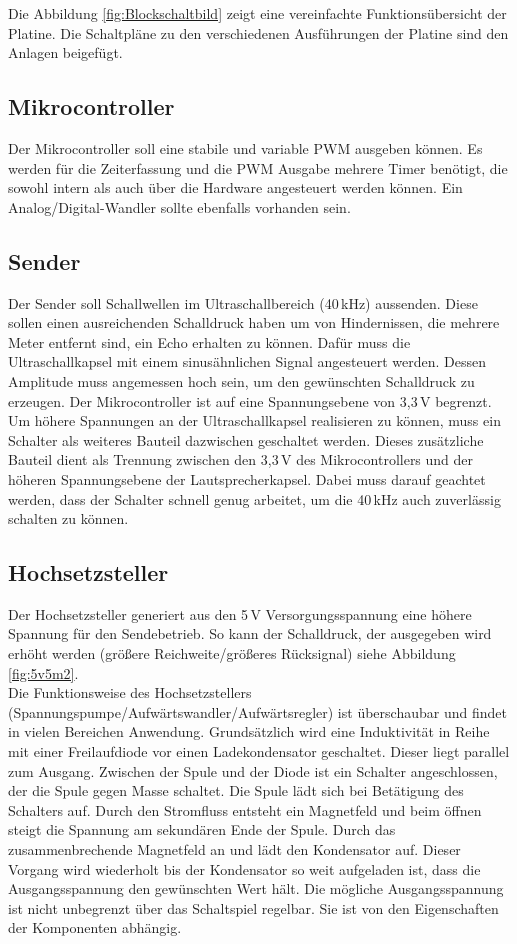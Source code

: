 Die Abbildung \ref{fig:Blockschaltbild} zeigt eine vereinfachte Funktionsübersicht der Platine. Die Schaltpläne zu den verschiedenen Ausführungen der Platine sind den Anlagen beigefügt.

\subsection{Mikrocontroller}
Der Mikrocontroller soll eine stabile und variable PWM ausgeben können. Es werden für die Zeiterfassung und die PWM Ausgabe mehrere Timer benötigt, die sowohl intern als auch über die Hardware angesteuert werden können. Ein Analog/Digital-Wandler sollte ebenfalls vorhanden sein.

\subsection{Sender}
Der Sender soll Schallwellen im Ultraschallbereich (40\,kHz) aussenden. Diese sollen einen ausreichenden Schalldruck haben um von Hindernissen, die mehrere Meter entfernt sind, ein Echo erhalten zu können. Dafür muss die Ultraschallkapsel mit einem sinusähnlichen Signal angesteuert werden. Dessen Amplitude muss angemessen hoch sein, um den gewünschten Schalldruck zu erzeugen. Der Mikrocontroller ist auf eine Spannungsebene von 3,3\,V begrenzt. Um höhere Spannungen an der Ultraschallkapsel realisieren zu können, muss ein Schalter als weiteres Bauteil dazwischen geschaltet werden. Dieses zusätzliche Bauteil dient als Trennung zwischen den 3,3\,V des Mikrocontrollers und der höheren Spannungsebene der Lautsprecherkapsel. Dabei muss darauf geachtet werden, dass der Schalter schnell genug arbeitet, um die 40\,kHz auch zuverlässig schalten zu können.

\subsection{Hochsetzsteller}
Der Hochsetzsteller generiert aus den 5\,V Versorgungsspannung eine höhere Spannung für den Sendebetrieb. So kann der Schalldruck, der ausgegeben wird erhöht werden (größere Reichweite/größeres Rücksignal) siehe Abbildung \ref{fig:5v5m2}.\\
Die Funktionsweise des Hochsetzstellers (Spannungspumpe/Aufwärtswandler/Aufwärtsregler) ist überschaubar und findet in vielen Bereichen Anwendung. Grundsätzlich wird eine Induktivität in Reihe mit einer Freilaufdiode vor einen Ladekondensator geschaltet. Dieser liegt parallel zum Ausgang. Zwischen der Spule und der Diode ist ein Schalter angeschlossen, der die Spule gegen Masse schaltet. Die Spule lädt sich bei Betätigung des Schalters auf. Durch den Stromfluss entsteht ein Magnetfeld und beim öffnen steigt die Spannung am sekundären Ende der Spule. Durch das zusammenbrechende Magnetfeld an und lädt den Kondensator auf. Dieser Vorgang wird wiederholt bis der Kondensator so weit aufgeladen ist, dass die Ausgangsspannung den gewünschten Wert hält. Die mögliche Ausgangsspannung ist nicht unbegrenzt über das Schaltspiel regelbar. Sie ist von den Eigenschaften der Komponenten abhängig. 

